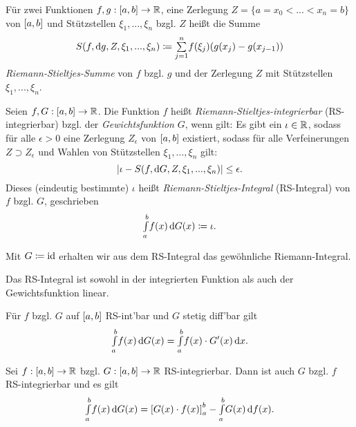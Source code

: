 \documentclass{cheat-sheet}
\begin{document}
\begin{defn}
  Für zwei Funktionen $f, g : \left[ a, b \right] \to \mathbb{R}$, eine Zerlegung $Z = \{ a = x_0 < ... < x_n = b \}$ von $\left[ a, b \right]$ und Stützstellen $\xi_1, ..., \xi_n$ bzgl. $Z$ heißt die Summe
  \[ S(f, \d g, Z, \xi_1, ..., \xi_n) \coloneqq \sum_{j=1}^{n}\!f(\xi_j)(g(x_j) - g(x_{j{-}1})) \]
  \emph{Riemann-Stieltjes-Summe} von $f$ bzgl. $g$ und der Zerlegung $Z$ mit Stützstellen $\xi_1, ..., \xi_n$.
\end{defn}

\begin{defn}
  Seien $f, G : \left[ a, b \right] \to \mathbb{R}$. Die Funktion $f$ heißt \emph{Riemann-Stieltjes-integrierbar} (RS-integrierbar) bzgl. der \emph{Gewichtsfunktion} $G$, wenn gilt: Es gibt ein $\iota \in \mathbb{R}$, sodass für alle $\epsilon > 0$ eine Zerlegung $Z_{\epsilon}$ von $\left[ a, b \right]$ existiert, sodass für alle Verfeinerungen $Z \supset Z_{\epsilon}$ und Wahlen von Stützstellen $\xi_1, ..., \xi_n$ gilt:
  \[ \lvert\iota - S(f, \mathrm{d} G, Z, \xi_1, ..., \xi_n)\rvert \le \epsilon. \]
  Dieses (eindeutig bestimmte) $\iota$ heißt \emph{Riemann-Stieltjes-Integral} (RS-Integral) von $f$ bzgl. $G$, geschrieben
  \[ {\textstyle \int\limits_{a}^{b}} f(x) \,\mathrm{d} G(x) \coloneqq \iota. \]
\end{defn}

\begin{bem}
  Mit $G \coloneqq \mathrm{id}$ erhalten wir aus dem RS-Integral das gewöhnliche Riemann-Integral.
\end{bem}

\begin{satz}
  Das RS-Integral ist sowohl in der integrierten Funktion als auch der Gewichtsfunktion linear.
\end{satz}

\begin{satz}
  Für $f$ bzgl. $G$ auf $\left[ a, b \right]$ RS-int'bar und $G$ stetig diff'bar gilt
  \[ {\textstyle \int\limits_{a}^{b}} f(x) \,\mathrm{d} G(x) = {\textstyle \int\limits_{a}^{b}} f(x) \cdot G'(x) \,\mathrm{d} x. \]
\end{satz}


\begin{satz} %
  Sei $f : \left[ a, b \right] \to \mathbb{R}$ bzgl. $G : \left[ a, b \right] \to \mathbb{R}$ RS-integrierbar. Dann ist auch $G$ bzgl. $f$ RS-integrierbar und es gilt
  \[ {\textstyle \int\limits_{a}^{b}} f(x) \,\mathrm{d} G(x) = \left[ G(x) \cdot f(x) \right]_a^b - {\textstyle \int\limits_{a}^{b}} G(x) \,\mathrm{d} f(x). \]
\end{satz}
\end{document}
